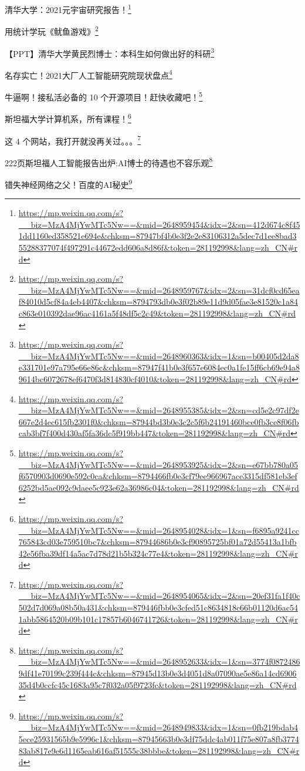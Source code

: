 \documentclass[]{ctexbook}
\renewcommand{\href}[2]{#2\footnote{\url{#1}}}
\begin{document}
\href{https://mp.weixin.qq.com/s?__biz=MzA4MjYwMTc5Nw==\&mid=2648959454\&idx=2\&sn=412d674c8f451dd1160ed358521e694e\&chksm=87947bf4b0e3f2e2e83106312a5dec7d1ee8bad355288377074f497291c44672edd606a8d86f\&token=281192998\&lang=zh_CN\#rd}{清华大学：2021元宇宙研究报告！}

\href{https://mp.weixin.qq.com/s?__biz=MzA4MjYwMTc5Nw==\&mid=2648959767\&idx=2\&sn=31dcf0cd65eaf84010d5cf84a4eb4407\&chksm=8794793db0e3f02b89e11d9d05fae3e81520c1a84c863e010392dae96ac4161a5f48df5c2c49\&token=281192998\&lang=zh_CN\#rd}{用统计学玩《鱿鱼游戏》}

\href{https://mp.weixin.qq.com/s?__biz=MzA4MjYwMTc5Nw==\&mid=2648960363\&idx=1\&sn=b00405d2da8e331701e97a795e66e86c\&chksm=87947f41b0e3f657e6084ec0a1fe15ff6cb69e94a89614bc6072678ef6470f3d814830cf4010\&token=281192998\&lang=zh_CN\#rd}{【PPT】清华大学黄民烈博士：本科生如何做出好的科研}

\href{https://mp.weixin.qq.com/s?__biz=MzA4MjYwMTc5Nw==\&mid=2648955385\&idx=2\&sn=cd5e2c97df2e667e2d4ec615fb2301f0\&chksm=87944bd3b0e3c2c5f6b24191460bce0fb3ce8f06fbcab3bf7f400d430af5fa36dc5f919bb447\&token=281192998\&lang=zh_CN\#rd}{名存实亡！2021大厂人工智能研究院现状盘点}

\href{https://mp.weixin.qq.com/s?__biz=MzA4MjYwMTc5Nw==\&mid=2648953925\&idx=2\&sn=e67bb780a05f6570903d0690e592c0ca\&chksm=8794466fb0e3cf79ee966967ace3315df581eb3ef6252bd5ae092c9daee5c923e62a36986c04\&token=281192998\&lang=zh_CN\#rd}{牛逼啊！接私活必备的 10 个开源项目！赶快收藏吧！}

\href{https://mp.weixin.qq.com/s?__biz=MzA4MjYwMTc5Nw==\&mid=2648954028\&idx=1\&sn=f6895a9241cc765843cd03e759510bc7\&chksm=87944686b0e3cf90895725bf01a72d55413a1bfb42e56fba39df14a5ac7d78d21b5b324c77e4\&token=281192998\&lang=zh_CN\#rd}{斯坦福大学计算机系，所有课程！}

\href{https://mp.weixin.qq.com/s?__biz=MzA4MjYwMTc5Nw==\&mid=2648954065\&idx=2\&sn=20ef31fa1f40c502d7d069a08b50a431\&chksm=879446fbb0e3cfed51c8634818c66b01120d6ac541abb5864520b09b101c17857b6046741726\&token=281192998\&lang=zh_CN\#rd}{这 4 个网站，我打开就没再关过。。。}

\href{https://mp.weixin.qq.com/s?__biz=MzA4MjYwMTc5Nw==\&mid=2648952633\&idx=1\&sn=3774f08724869df41e70199c239f444c\&chksm=87945d13b0e3d4051d8a07090ae5e86a14cd690635d4b0ccfc45c1683a95c7f032a05f9723fc\&token=281192998\&lang=zh_CN\#rd}{222页斯坦福人工智能报告出炉:AI博士的待遇也不容乐观}

\href{https://mp.weixin.qq.com/s?__biz=MzA4MjYwMTc5Nw==\&mid=2648949833\&idx=1\&sn=0fb219bdab45ece25931565b9e5996c1\&chksm=87945663b0e3df75ddc4ab011f75e807a8fb377483ab817e9e6d1165eab616af51555c38bbbe\&token=281192998\&lang=zh_CN\#rd}{错失神经网络之父！百度的AI秘史}
\end{document}
